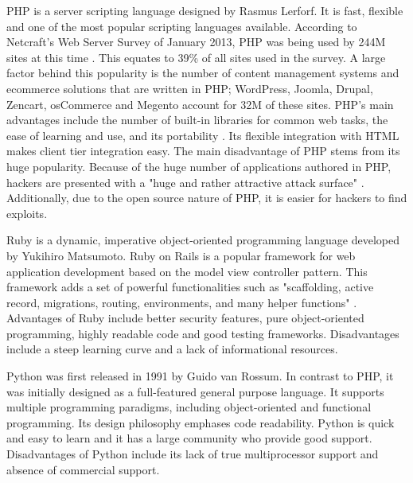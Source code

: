 \documentclass[authoryearcitations]{UoYCSproject}
\begin{document}
PHP is a server scripting language designed by Rasmus Lerforf. It is fast, flexible and one of the most popular scripting languages available. According to Netcraft's Web Server Survey of January 2013, PHP was being used by 244M sites at this time \citep{Ide2013}. This equates to 39\% of all sites used in the survey. A large factor behind this popularity is the number of content management systems and ecommerce solutions that are written in PHP; WordPress, Joomla, Drupal, Zencart, osCommerce and Megento account for 32M of these sites. PHP's main advantages include the number of built-in libraries for common web tasks, the ease of learning and use, and its portability \citep{Welling2005}. Its flexible integration with HTML makes client tier integration easy. The main disadvantage of PHP stems from its huge popularity. Because of the huge number of applications authored in PHP, hackers are presented with a "huge and rather attractive attack surface" \citep{Ide2013}. Additionally, due to the open source nature of PHP, it is easier for hackers to find exploits. 

Ruby is a dynamic, imperative object-oriented programming language developed by Yukihiro Matsumoto. Ruby on Rails is a popular framework for web application development based on the model view controller pattern. This framework adds a set of powerful functionalities such as "scaffolding, active record, migrations, routing, environments, and many helper functions" \citep{Jazayeri2007}. Advantages of Ruby include better security features, pure object-oriented programming, highly readable code and good testing frameworks. Disadvantages include a steep learning curve and a lack of informational resources.

Python was first released in 1991 by Guido van Rossum. In contrast to PHP, it was initially designed as a full-featured general purpose language. It supports multiple programming paradigms, including object-oriented and functional programming. Its design philosophy emphases code readability. Python is quick and easy to learn and it has a large community who provide good support. Disadvantages of Python include its lack of true multiprocessor support and absence of commercial support. 
\end{document}
